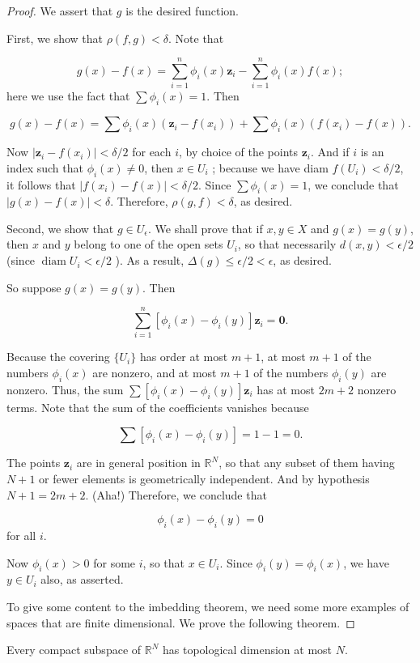 \begin{proof}
We assert that \(g\) is the desired function.

First, we show that \(\rho ({f,g}) < \delta\). Note that

\[
g(x) - f(x) = \mathop{\sum }\limits_{{i = 1}}^{n}{\phi }_{i}(x) \mathbf{z}_{i} - \mathop{\sum }\limits_{{i = 1}}^{n}{\phi }_{i}(x) f(x) ;
\]
here we use the fact that \(\sum {\phi }_{i}(x) = 1\). Then

\[
g(x) - f(x) = \sum {\phi }_{i}(x) ({\mathbf{z}_{i} - f(x_{i}) }) + \sum {\phi }_{i}(x) ({f(x_{i}) - f(x) }).
\]

Now \(| {\mathbf{z}_{i} - f(x_{i}) }| < \delta /2\) for each \(i\), by choice of the points \(\mathbf{z}_{i}\). And if \(i\) is an index such that \({\phi }_{i}(x) \neq 0\), then \(x \in {U}_{i}\) ; because we have diam \(f(U_{i}) < \delta /2\), it follows that \(| {f(x_{i}) - f(x) }| < \delta /2\). Since \(\sum {\phi }_{i}(x) = 1\), we conclude that \(| {g(x) - f(x) }| < \delta\). Therefore, \(\rho ({g,f}) < \delta\), as desired.

Second, we show that \(g \in {U}_{\epsilon }\). We shall prove that if \(x,y \in X\) and \(g(x) = g( y)\), then \(x\) and \(y\) belong to one of the open sets \(U_{i}\), so that necessarily \(d({x,y}) < \epsilon /2\) (since \(\operatorname{diam}U_{i} < \epsilon /2\) ). As a result, \(\Delta ( g) \leq \epsilon /2 < \epsilon\), as desired.

So suppose \(g(x) = g( y)\). Then

\[
\mathop{\sum }\limits_{{i = 1}}^{n}[ {{\phi }_{i}(x) - {\phi }_{i}( y) }] \mathbf{z}_{i} = \mathbf{0}.
\]

Because the covering \(\{ U_{i}\}\) has order at most \(m + 1\), at most \(m + 1\) of the numbers \({\phi }_{i}(x)\) are nonzero, and at most \(m + 1\) of the numbers \({\phi }_{i}( y)\) are nonzero. Thus, the sum \(\sum [ {{\phi }_{i}(x) - {\phi }_{i}( y) }] \mathbf{z}_{i}\) has at most \({2m} + 2\) nonzero terms. Note that the sum of the coefficients vanishes because

\[
\sum [ {{\phi }_{i}(x) - {\phi }_{i}( y) }] = 1 - 1 = 0.
\]

The points \(\mathbf{z}_{i}\) are in general position in \(\mathbb{R}^{N}\), so that any subset of them having \(N + 1\) or fewer elements is geometrically independent. And by hypothesis \(N + 1 = {2m} + 2\). (Aha!) Therefore, we conclude that

\[
{\phi }_{i}(x) - {\phi }_{i}( y) = 0
\]
for all \(i\).

Now \({\phi }_{i}(x) > 0\) for some \(i\), so that \(x \in {U}_{i}\). Since \({\phi }_{i}( y) = {\phi }_{i}(x)\), we have \(y \in {U}_{i}\) also, as asserted.

To give some content to the imbedding theorem, we need some more examples of spaces that are finite dimensional. We prove the following theorem.
\end{proof}
\begin{theorem}
\label{thm:\thetheorem}
Every compact subspace of \(\mathbb{R}^{N}\) has topological dimension at most \(N\).
\end{theorem}

